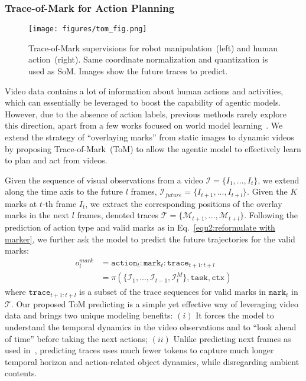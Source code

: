 \subsubsection{Trace-of-Mark for Action Planning}
\label{sec:tom}

\begin{figure*}[t]
    \centering
    \texttt{[image: figures/tom\_fig.png]}
    \vspace{-0.7cm}
    \caption{Trace-of-Mark supervisions for robot manipulation~(left) and human action~(right). Same coordinate normalization and quantization is used as SoM. Images show the future traces to predict.}
    \label{fig:tom_illustration}
\end{figure*}
Video data contains a lot of information about human actions and activities, which can essentially be leveraged to boost the capability of agentic models. However, due to the absence of action labels, previous methods rarely explore this direction, apart from a few works focused on world model learning~\cite{mendonca2023structured,liu2024world}.
We extend the strategy of ``overlaying marks'' from static images to dynamic videos by proposing Trace-of-Mark~(ToM) to allow the agentic model to effectively learn to plan and act from videos. 

Given the sequence of visual observations from a video $\mathcal{I} = \{I_1,...,I_t\}$, we extend along the time axis to the future $l$ frames, $\mathcal{I}_{future} = \{I_{t+1}, ..., I_{t+l}\}$. Given the $K$ marks at $t$-th frame $I_t$, we extract the corresponding positions of the overlay marks in the next $l$ frames, denoted traces $\mathcal{T} = \{\mathcal{M}_{t+1}, ..., \mathcal{M}_{t+l}\}$. Following the prediction of action type and valid marks as in Eq.~\eqref{equ2:reformulate with marker}, we further ask the model to predict the future trajectories for the valid marks:
\begin{equation}
\begin{aligned}
  {o}_t^{mark} & = \texttt{action}_t:\texttt{mark}_t:\texttt{trace}_{t+1:t+l} \\
& = \pi(\{\mathcal{I}_1,...,\mathcal{I}_{t-1},\mathcal{I}_t^{M}\}, \texttt{task}, \texttt{ctx})    
\end{aligned}
\label{EQ:ToM}
\end{equation}
where $\texttt{trace}_{t+1:t+l}$ is a subset of the trace sequences for valid marks in $\texttt{mark}_t$ in $\mathcal{T}$. Our proposed ToM predicting is a simple yet effective way of leveraging video data and brings two unique modeling benefits: $(i)$ It forces the model to understand the temporal dynamics in the video observations and to ``look ahead of time'' before taking the next actions; $(ii)$ Unlike predicting next frames as used in~\cite{liu2024worldmodelmillionlengthvideo}, predicting traces uses much fewer tokens to capture much longer temporal horizon and action-related object dynamics, while disregarding ambient contents.

